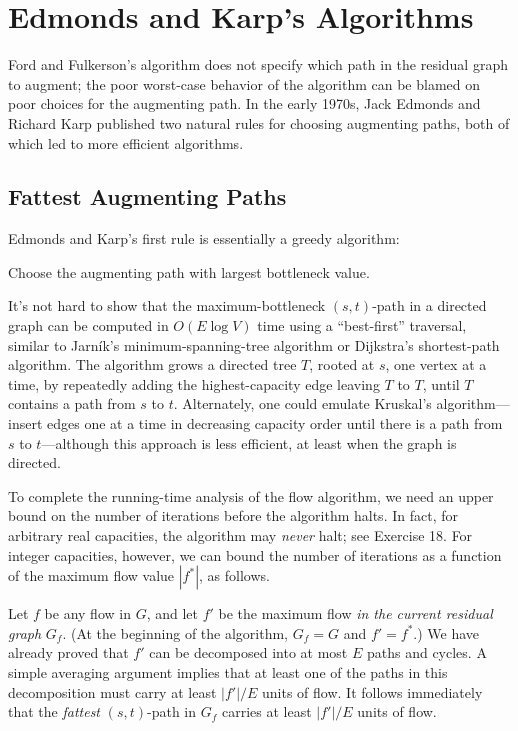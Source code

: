 \section{Edmonds and Karp’s Algorithms}
\label{sec:10.6}

Ford and Fulkerson’s algorithm does not specify which path in the residual graph to augment; the poor worst-case behavior of the algorithm can be blamed on poor choices for the augmenting path.
In the early 1970s, Jack Edmonds and Richard Karp published two natural rules for choosing augmenting paths, both of which led to more efficient algorithms.

\subsection{Fattest Augmenting Paths}

Edmonds and Karp’s first rule is essentially a greedy algorithm:

\begin{problembox}
Choose the augmenting path with largest bottleneck value.
\end{problembox}

It’s not hard to show that the maximum-bottleneck $(s,t)$-path in a directed graph can be computed in $O(E \log V)$ time using a “best-first” traversal, similar to Jarník’s minimum-spanning-tree algorithm or Dijkstra’s shortest-path algorithm.
The algorithm grows a directed tree $T$, rooted at $s$, one vertex at a time, by repeatedly adding the highest-capacity edge leaving $T$ to $T$, until $T$ contains a path from $s$ to $t$.
Alternately, one could emulate Kruskal’s algorithm---insert edges one at a time in decreasing capacity order until there is a path from $s$ to $t$---although this approach is less efficient, at least when the graph is directed.

To complete the running-time analysis of the flow algorithm, we need an upper bound on the number of iterations before the algorithm halts.
In fact, for arbitrary real capacities, the algorithm may \textit{never} halt; see Exercise 18.
For integer capacities, however, we can bound the number of iterations as a function of the maximum flow value $|f^*|$, as follows.

Let $f$ be any flow in $G$, and let $f'$ be the maximum flow \textit{in the current residual graph} $G_f$.
(At the beginning of the algorithm, $G_f = G$ and $f' = f^*$.)
We have already proved that $f'$ can be decomposed into at most $E$ paths and cycles.
A simple averaging argument implies that at least one of the paths in this decomposition must carry at least $|f'|/E$ units of flow.
It follows immediately that the \textit{fattest} $(s,t)$-path in $G_f$ carries at least $|f'|/E$ units of flow.

